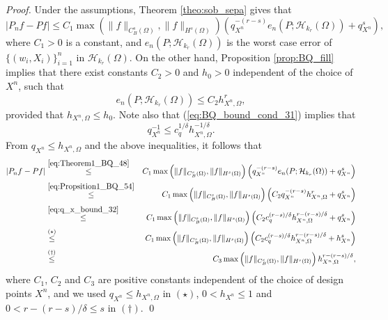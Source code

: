 \documentclass[11pt]{article}
\theoremstyle{remark}
\theoremstyle{example}
\theoremstyle{remark}
\renewcommand{\H}{{\mathcal{H}}}
\begin{document}
\begin{proof}
Under the assumptions, Theorem \ref{theo:sob_sepa} gives that
\begin{equation} \label{eq:Theorem1_BQ_48}
\left| P_n f - Pf \right| \leq C_1 \max \left(  \| f \|_{C_B^s(\Omega)}, \| f \|_{H^s(\Omega)}  \right)  \left(  q_{X^n}^{- (r-s) } e_n(P; \H_{k_r}(\Omega)) + q_{X^n}^{s} \right),
\end{equation}
where $C_1 > 0$ is a constant, and $e_n(P; \H_{k_r}(\Omega))$ is the worst case error of $\{ (w_i,X_i) \}_{i=1}^n$ in $\H_{k_r}(\Omega)$. On the other hand, Proposition \ref{prop:BQ_fill} implies that there exist constants $C_2 > 0$ and $h_0 > 0$ independent of the choice of $X^n$, such that 
\begin{equation} \label{eq:Propsition1_BQ_54}
e_n(P; \H_{k_r}(\Omega))  \leq C_2 h_{X^n,\Omega}^r,
\end{equation}
provided that $h_{X^n,\Omega} \leq h_0$. 
Note also that (\ref{eq:BQ_bound_cond_31}) implies that 
\begin{equation} \label{eq:q_x_bound_32}
q_{X^n}^{-1} \leq c_q^{1/\delta} h_{X^n, \Omega}^{-1/\delta}.
\end{equation}
From $q_{X^n} \leq h_{X^n,\Omega}$ and the above inequalities, it follows that 
\begin{eqnarray*}
\left| P_n f - Pf \right| 
&\stackrel{\eqref{eq:Theorem1_BQ_48}}{\leq}&  C_1 \max \left(  \| f \|_{C_B^s(\Omega)}, \| f \|_{H^s(\Omega)}  \right)  \left(  q_{X^n}^{- (r-s) } e_n(P; \H_{k_r}(\Omega)) + q_{X^n}^{s} \right)\\
&\stackrel{\eqref{eq:Propsition1_BQ_54}}{\leq}&  C_1 \max \left(  \| f \|_{C_B^s(\Omega)}, \| f \|_{H^s(\Omega)}  \right)  \left( C_2  q_{X^n}^{- (r-s) }  h_{X^n,\Omega}^r + q_{X^n}^{s} \right)\\
&\stackrel{\eqref{eq:q_x_bound_32}}{\leq}&  C_1 \max \left(  \| f \|_{C_B^s(\Omega)}, \| f \|_{H^s(\Omega)}  \right)  \left( C_2 c_q^{(r-s)/\delta} h_{X^n,\Omega}^{r- (r-s)/\delta} + q_{X^n}^{s} \right)  \\
&\stackrel{(\star)}{\leq}&  C_1 \max \left(  \| f \|_{C_B^s(\Omega)}, \| f \|_{H^s(\Omega)}  \right)  \left( C_2 c_q^{(r-s)/\delta} h_{X^n,\Omega}^{r- (r-s)/\delta} + h_{X^n}^{s} \right)  \\
&\stackrel{(\dagger)}{\leq}& C_3 \max \left(  \| f \|_{C_B^s(\Omega)}, \| f \|_{H^s(\Omega)}  \right) h_{X^n,\Omega}^{r- (r-s)/\delta},
\end{eqnarray*}
where $C_1$, $C_2$ and $C_3$ are positive constants independent of the choice of design points $X^n$, and we used $q_{X^n} \leq h_{X^n,\Omega}$ in $(\star)$, $ 0 < h_{X^n} \leq 1$ and $0 < r - (r-s)/\delta \leq s$ in $(\dagger)$.  \qed
\end{proof}
\end{document}
